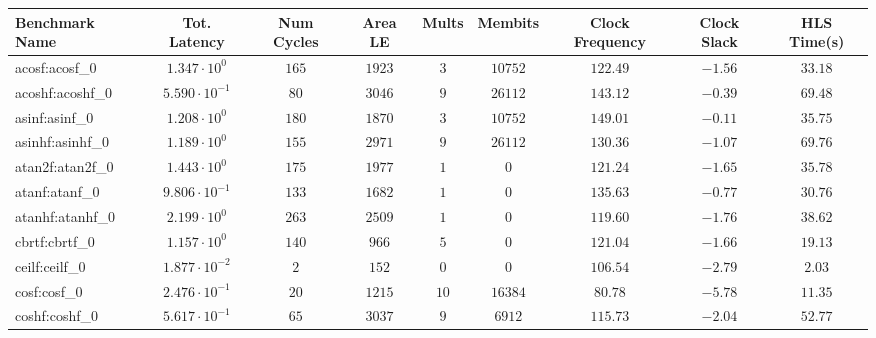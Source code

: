 \begin{tabular}{|l|c|c|c|c|c|c|c|c|}
\hline
Benchmark Name               & Tot. Latency            & Num Cycles & Area LE   & Mults   & Membits    & Clock Frequency & Clock Slack & HLS Time(s) \\
\hline
acosf:acosf\_0               & $ 1.347 \cdot 10^{0}  $ & $ 165    $ & $ 1923  $ & $ 3   $ & $ 10752  $ & $ 122.49      $ & $ -1.56   $ & $ 33.18   $ \\
acoshf:acoshf\_0             & $ 5.590 \cdot 10^{-1} $ & $ 80     $ & $ 3046  $ & $ 9   $ & $ 26112  $ & $ 143.12      $ & $ -0.39   $ & $ 69.48   $ \\
asinf:asinf\_0               & $ 1.208 \cdot 10^{0}  $ & $ 180    $ & $ 1870  $ & $ 3   $ & $ 10752  $ & $ 149.01      $ & $ -0.11   $ & $ 35.75   $ \\
asinhf:asinhf\_0             & $ 1.189 \cdot 10^{0}  $ & $ 155    $ & $ 2971  $ & $ 9   $ & $ 26112  $ & $ 130.36      $ & $ -1.07   $ & $ 69.76   $ \\
atan2f:atan2f\_0             & $ 1.443 \cdot 10^{0}  $ & $ 175    $ & $ 1977  $ & $ 1   $ & $ 0      $ & $ 121.24      $ & $ -1.65   $ & $ 35.78   $ \\
atanf:atanf\_0               & $ 9.806 \cdot 10^{-1} $ & $ 133    $ & $ 1682  $ & $ 1   $ & $ 0      $ & $ 135.63      $ & $ -0.77   $ & $ 30.76   $ \\
atanhf:atanhf\_0             & $ 2.199 \cdot 10^{0}  $ & $ 263    $ & $ 2509  $ & $ 1   $ & $ 0      $ & $ 119.60      $ & $ -1.76   $ & $ 38.62   $ \\
cbrtf:cbrtf\_0               & $ 1.157 \cdot 10^{0}  $ & $ 140    $ & $ 966   $ & $ 5   $ & $ 0      $ & $ 121.04      $ & $ -1.66   $ & $ 19.13   $ \\
ceilf:ceilf\_0               & $ 1.877 \cdot 10^{-2} $ & $ 2      $ & $ 152   $ & $ 0   $ & $ 0      $ & $ 106.54      $ & $ -2.79   $ & $ 2.03    $ \\
cosf:cosf\_0                 & $ 2.476 \cdot 10^{-1} $ & $ 20     $ & $ 1215  $ & $ 10  $ & $ 16384  $ & $ 80.78       $ & $ -5.78   $ & $ 11.35   $ \\
coshf:coshf\_0               & $ 5.617 \cdot 10^{-1} $ & $ 65     $ & $ 3037  $ & $ 9   $ & $ 6912   $ & $ 115.73      $ & $ -2.04   $ & $ 52.77   $ \\

\end{tabular}
